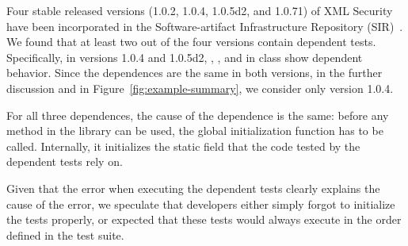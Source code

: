 

Four stable released versions (1.0.2, 1.0.4, 1.0.5d2, and 1.0.71) of XML Security
have been incorporated in the Soft\-ware-artifact Infrastructure Repository
(SIR)~\cite{sir}.
We found that at least two out of the four versions contain dependent tests. Specifically, in versions 1.0.4 and 1.0.5d2, , , and 
in class  show dependent behavior.
Since the dependences are the same in both versions, in the further
discussion and in Figure~\ref{fig:example-summary}, we consider only
version 1.0.4.

For all three dependences, the cause of the dependence is the same: before any
method in the library can be used, the global initialization function 
 has to be called. Internally, it initializes
the static field that the code tested by the dependent tests rely
on.

Given that the error when executing the dependent tests clearly explains the
cause of the error, we speculate that developers either simply forgot to
initialize the tests properly, or expected that these tests would always execute
in the order defined
in the test suite.

%
%


